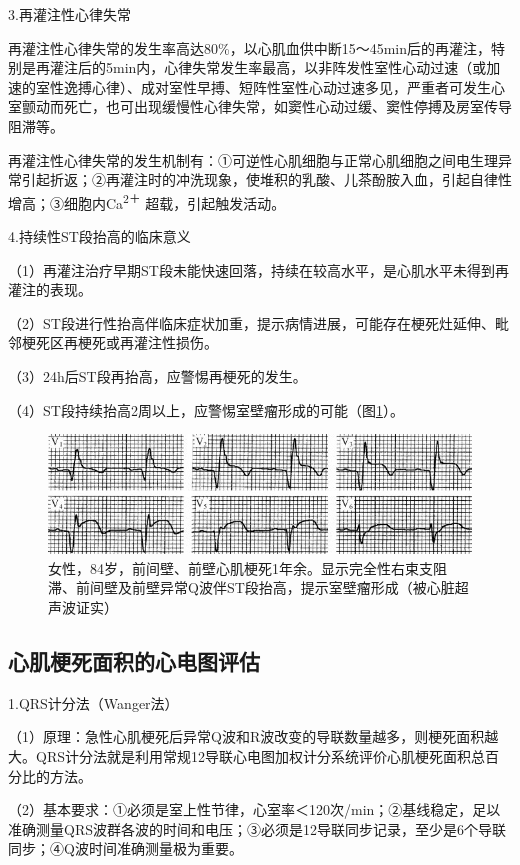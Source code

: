 3.再灌注性心律失常

再灌注性心律失常的发生率高达80\%，以心肌血供中断15～45min后的再灌注，特别是再灌注后的5min内，心律失常发生率最高，以非阵发性室性心动过速（或加速的室性逸搏心律）、成对室性早搏、短阵性室性心动过速多见，严重者可发生心室颤动而死亡，也可出现缓慢性心律失常，如窦性心动过缓、窦性停搏及房室传导阻滞等。

再灌注性心律失常的发生机制有：①可逆性心肌细胞与正常心肌细胞之间电生理异常引起折返；②再灌注时的冲洗现象，使堆积的乳酸、儿茶酚胺入血，引起自律性增高；③细胞内Ca\textsuperscript{2＋}
超载，引起触发活动。

4.持续性ST段抬高的临床意义

（1）再灌注治疗早期ST段未能快速回落，持续在较高水平，是心肌水平未得到再灌注的表现。

（2）ST段进行性抬高伴临床症状加重，提示病情进展，可能存在梗死灶延伸、毗邻梗死区再梗死或再灌注性损伤。

（3）24h后ST段再抬高，应警惕再梗死的发生。

（4）ST段持续抬高2周以上，应警惕室壁瘤形成的可能（图\ref{fig44-17}）。

\begin{figure}[!htbp]
 \centering
 \includegraphics[width=4.4375in,height=1.25in]{./images/Image00725.jpg}
 \captionsetup{justification=centering}
 \caption{女性，84岁，前间壁、前壁心肌梗死1年余。显示完全性右束支阻滞、前间壁及前壁异常Q波伴ST段抬高，提示室壁瘤形成（被心脏超声波证实）}
 \label{fig44-17}
  \end{figure} 

\protect\hypertarget{text00052.htmlux5cux23subid632}{}{}

\subsection{心肌梗死面积的心电图评估}

1.QRS计分法（Wanger法）

（1）原理：急性心肌梗死后异常Q波和R波改变的导联数量越多，则梗死面积越大。QRS计分法就是利用常规12导联心电图加权计分系统评价心肌梗死面积总百分比的方法。

（2）基本要求：①必须是室上性节律，心室率＜120次/min；②基线稳定，足以准确测量QRS波群各波的时间和电压；③必须是12导联同步记录，至少是6个导联同步；④Q波时间准确测量极为重要。


